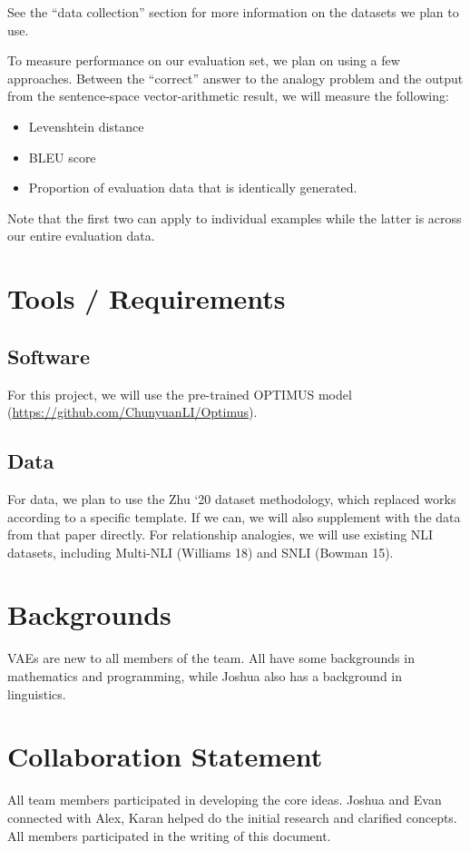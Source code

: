 \documentclass[11pt]{article}
\begin{document}
See the “data collection” section for more information on the datasets we plan to use.

To measure performance on our evaluation set, we plan on using a few approaches. Between the “correct” answer to the analogy problem and the output from the sentence-space vector-arithmetic result, we will measure the following:
\begin{itemize}
\item Levenshtein distance
\item BLEU score
\item Proportion of evaluation data that is identically generated.
\end{itemize}

Note that the first two can apply to individual examples while the latter is across our entire evaluation data.

\section{Tools / Requirements}
\label{sec:orgea1b9d1}
\subsection{Software}
\label{sec:orgfd665d2}
For this project, we will use the pre-trained OPTIMUS model (\url{https://github.com/ChunyuanLI/Optimus}).
\subsection{Data}
\label{sec:org51e6914}
For data, we plan to use the Zhu ‘20 dataset methodology, which replaced works according to a specific template. If we can, we will also supplement with the data from that paper directly. For relationship analogies, we will use existing NLI datasets, including Multi-NLI (Williams 18) and SNLI (Bowman 15).
\section{Backgrounds}
\label{sec:org24a8495}
VAEs are new to all members of the team. All have some backgrounds in mathematics and programming, while Joshua also has a background in linguistics.
\section{Collaboration Statement}
\label{sec:org51d81fe}
All team members participated in developing the core ideas. Joshua and Evan connected with Alex, Karan helped do the initial research and clarified concepts. All members participated in the writing of this document.
\end{document}
